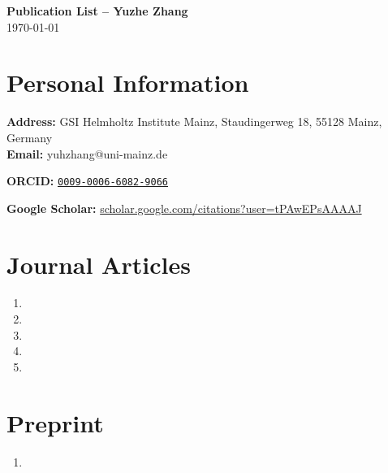 \documentclass[11pt,a4paper]{article}
\begin{document}
\begin{center}
{\Large \textbf{Publication List -- Yuzhe Zhang}} \\[0.3em]
\today{}\\
\end{center}

\vspace{0.5em}

\section*{Personal Information}

\noindent\textbf{Address:} GSI Helmholtz Institute Mainz, Staudingerweg 18, 55128 Mainz, Germany \\
\textbf{Email:} yuhzhang@uni-mainz.de

\noindent\textbf{ORCID:} \href{https://orcid.org/0009-0006-6082-9066}{\texttt{0009-0006-6082-9066}}

\noindent\textbf{Google Scholar:} \href{https://scholar.google.com/citations?user=tPAwEPsAAAAJ&hl=en&oi=sra}{scholar.google.com/citations?user=tPAwEPsAAAAJ}

\section*{Journal Articles}
\begin{enumerate}
    \item {}
    \item {}
    \item {}
    \item {}
    \item {}
\end{enumerate}

\section*{Preprint}
\begin{enumerate}
    \item {}
\end{enumerate}
\end{document}
